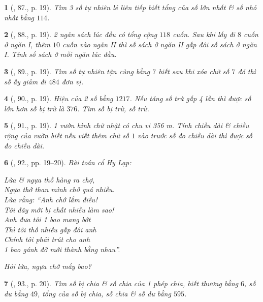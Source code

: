 \documentclass{article}
\newtheorem{baitoan}{}
\begin{document}
\begin{baitoan}[\cite{Binh_Toan_6_tap_1}, 87., p. 19]
	Tìm 3 số tự nhiên lẻ liên tiếp biết tổng của số lớn nhất \& số nhỏ nhất bằng $114$.
\end{baitoan}

\begin{baitoan}[\cite{Binh_Toan_6_tap_1}, 88., p. 19]
	2 ngăn sách lúc đầu có tổng cộng $118$ cuốn. Sau khi lấy đi $8$ cuốn ở ngăn {\rm I}, thêm $10$ cuốn vào ngăn {\rm II} thì số sách ở ngăn {\rm II} gấp đôi số sách ở ngăn {\rm I}. Tính số sách ở mỗi ngăn lúc đầu.
\end{baitoan}

\begin{baitoan}[\cite{Binh_Toan_6_tap_1}, 89., p. 19]
	Tìm số tự nhiên tận cùng bằng $7$ biết sau khi xóa chữ số $7$ đó thì số ấy giảm đi $484$ đơn vị.
\end{baitoan}

\begin{baitoan}[\cite{Binh_Toan_6_tap_1}, 90., p. 19]
	Hiệu của 2 số bằng $1217$. Nếu tăng số trừ gấp 4 lần thì được số lớn hơn số bị trừ là $376$. Tìm số bị trừ, số trừ.
\end{baitoan}

\begin{baitoan}[\cite{Binh_Toan_6_tap_1}, 91., p. 19]
	1 vườn hình chữ nhật có chu vi {\rm356 m}. Tính chiều dài \& chiều rộng của vườn biết nếu viết thêm chữ số $1$ vào trước số đo chiều dài thì được số đo chiều dài.
\end{baitoan}

\begin{baitoan}[\cite{Binh_Toan_6_tap_1}, 92., pp. 19--20]
	Bài toán cổ Hy Lạp:
	\begin{center}
		Lừa \& ngựa thồ hàng ra chợ,\\Ngựa thở than mình chở quá nhiều.\\Lừa rằng: ``Anh chớ lắm điều!\\Tôi đây mới bị chất nhiều làm sao!\\Anh đưa tôi 1 bao mang bớt\\Thì tôi thồ nhiều gấp đôi anh\\Chính tôi phải trút cho anh\\1 bao gánh đỡ mới thành bằng nhau''.
	\end{center}
	Hỏi lừa, ngựa chở mấy bao?
\end{baitoan}

\begin{baitoan}[\cite{Binh_Toan_6_tap_1}, 93., p. 20]
	Tìm số bị chia \& số chia của 1 phép chia, biết thương bằng $6$, số dư bằng $49$, tổng của số bị chia, số chia \& số dư bằng $595$.
\end{baitoan}
\end{document}
